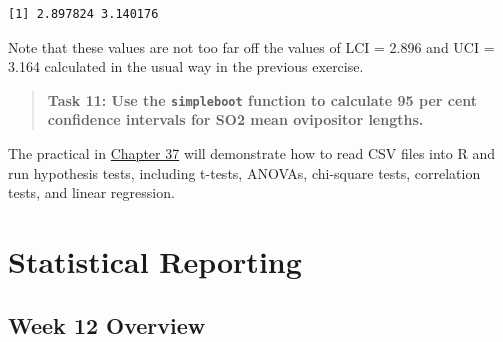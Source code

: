 \documentclass[
]{scrbook}
\begin{document}
\begin{verbatim}
[1] 2.897824 3.140176
\end{verbatim}

Note that these values are not too far off the values of LCI = 2.896 and UCI = 3.164 calculated in the usual way in the previous exercise.

\begin{quote}
\textbf{Task 11: Use the \texttt{simpleboot} function to calculate 95 per cent confidence intervals for SO2 mean ovipositor lengths.}
\end{quote}

The practical in \protect\hyperlink{Chapter_37}{Chapter 37} will demonstrate how to read CSV files into R and run hypothesis tests, including t-tests, ANOVAs, chi-square tests, correlation tests, and linear regression.

\hypertarget{part-statistical-reporting}{%
\part{Statistical Reporting}\label{part-statistical-reporting}}

\hypertarget{Week12}{%
\chapter*{Week 12 Overview}\label{Week12}}
\end{document}
